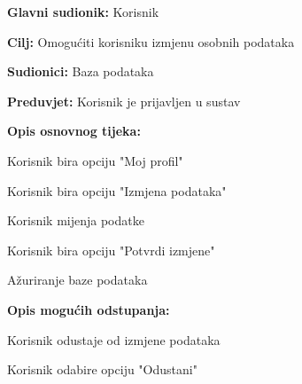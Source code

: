 					\noindent {}
					\begin{packed_item}
						
						\item \textbf{Glavni sudionik: }Korisnik
						\item  \textbf{Cilj:} Omogućiti korisniku izmjenu osobnih podataka
						\item  \textbf{Sudionici:} Baza podataka
						\item  \textbf{Preduvjet:} Korisnik je prijavljen u sustav
						\item  \textbf{Opis osnovnog tijeka:}
						
						\item[] \begin{packed_enum}
							
							\item Korisnik bira opciju "Moj profil"
							\item Korisnik bira opciju "Izmjena podataka"
							\item Korisnik mijenja podatke
							\item Korisnik bira opciju "Potvrdi izmjene"
							\item Ažuriranje baze podataka
						\end{packed_enum}
						
						\item  \textbf{Opis mogućih odstupanja:}
						
						\item[] \begin{packed_item}
							
							\item[2.a] Korisnik odustaje od izmjene podataka
							\item[] \begin{packed_enum}
								
								\item Korisnik odabire opciju "Odustani"
							\end{packed_enum}
						\end{packed_item}
					\end{packed_item}
				
